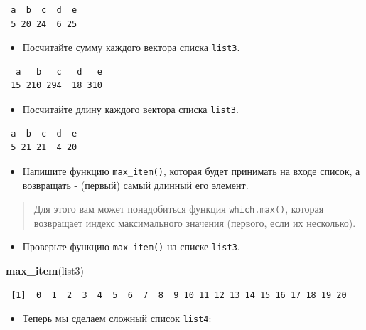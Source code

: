 \documentclass[
]{book}
\newenvironment{Shaded}{\begin{snugshade}}{\end{snugshade}}
\newcommand{\KeywordTok}[1]{\textcolor[rgb]{0.13,0.29,0.53}{\textbf{#1}}}
\newcommand{\NormalTok}[1]{#1}
\providecommand{\tightlist}{%
  \setlength{\itemsep}{0pt}\setlength{\parskip}{0pt}}
\begin{document}
\begin{verbatim}
 a  b  c  d  e 
 5 20 24  6 25 
\end{verbatim}

\begin{itemize}
\tightlist
\item
  Посчитайте сумму каждого вектора списка \texttt{list3}.
\end{itemize}

\begin{verbatim}
  a   b   c   d   e 
 15 210 294  18 310 
\end{verbatim}

\begin{itemize}
\tightlist
\item
  Посчитайте длину каждого вектора списка \texttt{list3}.
\end{itemize}

\begin{verbatim}
 a  b  c  d  e 
 5 21 21  4 20 
\end{verbatim}

\begin{itemize}
\tightlist
\item
  Напишите функцию \texttt{max\_item()}, которая будет принимать на входе список, а возвращать - (первый) самый длинный его элемент.
\end{itemize}

\begin{quote}
Для этого вам может понадобиться функция \texttt{which.max()}, которая возвращает индекс максимального значения (первого, если их несколько).
\end{quote}

\begin{itemize}
\tightlist
\item
  Проверьте функцию \texttt{max\_item()} на списке \texttt{list3}.
\end{itemize}

\begin{Shaded}
\begin{Highlighting}[]
\KeywordTok{max_item}\NormalTok{(list3)}
\end{Highlighting}
\end{Shaded}

\begin{verbatim}
 [1]  0  1  2  3  4  5  6  7  8  9 10 11 12 13 14 15 16 17 18 19 20
\end{verbatim}

\begin{itemize}
\tightlist
\item
  Теперь мы сделаем сложный список \texttt{list4}:
\end{itemize}
\end{document}
